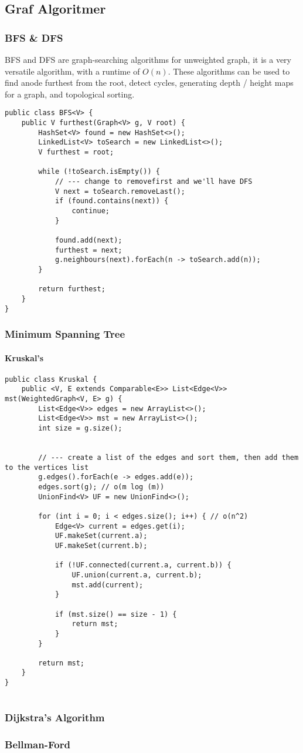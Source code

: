\documentclass{article}
\begin{document}
    \subsection{Graf Algoritmer}
    \subsubsection{BFS \& DFS}
    BFS and DFS are graph-searching algorithms for unweighted graph, it is a very versatile algorithm, with a runtime of \( O(n)\). These algorithms can be used to find anode furthest from the root, detect cycles, generating depth / height maps for a graph, and topological sorting.
    \begin{lstlisting}
public class BFS<V> {
    public V furthest(Graph<V> g, V root) {
        HashSet<V> found = new HashSet<>();
        LinkedList<V> toSearch = new LinkedList<>();
        V furthest = root;

        while (!toSearch.isEmpty()) {
            // --- change to removefirst and we'll have DFS
            V next = toSearch.removeLast();
            if (found.contains(next)) {
                continue;
            }

            found.add(next);
            furthest = next;
            g.neighbours(next).forEach(n -> toSearch.add(n));
        }

        return furthest;
    }
}
    \end{lstlisting}
    \subsubsection{Minimum Spanning Tree}
    \paragraph{Kruskal's}
    \begin{lstlisting}
public class Kruskal {
	public <V, E extends Comparable<E>> List<Edge<V>> mst(WeightedGraph<V, E> g) {
		List<Edge<V>> edges = new ArrayList<>();
		List<Edge<V>> mst = new ArrayList<>();
		int size = g.size();


		// --- create a list of the edges and sort them, then add them to the vertices list
        g.edges().forEach(e -> edges.add(e));
		edges.sort(g); // o(m log (m))
		UnionFind<V> UF = new UnionFind<>();

		for (int i = 0; i < edges.size(); i++) { // o(n^2)
			Edge<V> current = edges.get(i);
			UF.makeSet(current.a);
			UF.makeSet(current.b);

            if (!UF.connected(current.a, current.b)) {
                UF.union(current.a, current.b);
                mst.add(current);
            }

			if (mst.size() == size - 1) {
				return mst;
			}
		}

		return mst;
	}
}
        
    \end{lstlisting}

    \subsubsection{Dijkstra's Algorithm}
    \subsubsection{Bellman-Ford}
\end{document}
